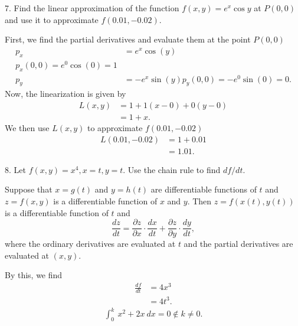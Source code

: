 \documentclass{report}
\begin{document}
    \bigbreak \noindent 
    \begin{mdframed}
        7. Find the linear approximation of the function $f(x, y)=e^x \cos y$ at $P(0,0)$ and use it to approximate $f(0.01,-0.02)$.
    \end{mdframed}
    \bigbreak \noindent 
    First, we find the partial derivatives and evaluate them at the point $P(0,0)$
    \begin{align*}
        p_{x} &= e^{x}\cos{\left(y\right)} \\
        p_{x}(0,0) = e^{0}\cos{\left(0\right)} = 1 \\
        p_{y} &= -e^{x}\sin{\left(y\right)}
        p_{y}(0,0) = -e^{0}\sin{\left(0\right)} =  0
    .\end{align*}
    \bigbreak \noindent 
    Now, the linearization is given by
    \begin{align*}
        L(x,y) &= 1+ 1(x-0) + 0(y-0) \\
        &=1 + x
    .\end{align*}
    \bigbreak \noindent 
    We then use $L(x,y)$ to approximate $f(0.01, -0.02)$
    \begin{align*}
        L(0.01, -0.02) &= 1 + 0.01 \\
        &=1.01
    .\end{align*}


    \bigbreak \noindent 
    \begin{mdframed}
        8. Let $f(x, y)=x^4, x=t, y=t$. Use the chain rule to find $d f / d t$.
    \end{mdframed}
    \bigbreak \noindent 
    \begin{remark}
        Suppose that \(x = g(t)\) and \(y = h(t)\) are differentiable functions of \(t\) and \(z = f(x,y)\) is a differentiable function of \(x\) and \(y\). Then \(z = f(x(t), y(t))\) is a differentiable function of \(t\) and
        \[
            \frac{dz}{dt} = \frac{\partial z}{\partial x} \cdot \frac{dx}{dt} + \frac{\partial z}{\partial y} \cdot \frac{dy}{dt},
        \]
        where the ordinary derivatives are evaluated at \(t\) and the partial derivatives are evaluated at \((x,y)\).
    \end{remark}
    \bigbreak \noindent 
    By this, we find
    \begin{align*}
        \frac{df}{dt} &= 4x^{3} \\
                      &= 4t^{3}
    .\end{align*}
    \not\in
    \begin{align*}
        \int_{0}^{k}\ x^{2}+2x\ dx =  0 \not\in k\neq 0 
    .\end{align*}
    
\end{document}
